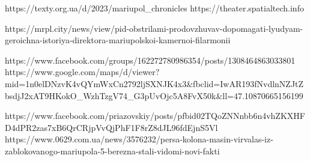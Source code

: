  
 
 
 
 


https://texty.org.ua/d/2023/mariupol_chronicles
https://theater.spatialtech.info

https://mrpl.city/news/view/pid-obstrilami-prodovzhuvav-dopomagati-lyudyam-geroichna-istoriya-direktora-mariupolskoi-kamernoi-filarmonii

https://www.facebook.com/groups/162272780986354/posts/1308464863033801
https://www.google.com/maps/d/viewer?mid=1n0elDNzvK4vQYmWxCn2792ljSXNJK4x3&fbclid=IwAR193fNvdlnNZJtZbsdjJ2xAT9HKokO_WzhTzgV74_G3pUvOjc5A8FvX50k&ll=47.10870665156199%

https://www.facebook.com/priazovskiy/posts/pfbid02TQoZNNnbb6n4vhZKXHFD4dPR2zas7xB6QrCRjpVvQjPhF1F8rZ8dJL96fdEjnS5Vl
https://www.0629.com.ua/news/3576232/persa-kolona-masin-virvalas-iz-zablokovanogo-mariupola-5-berezna-stali-vidomi-novi-fakti
